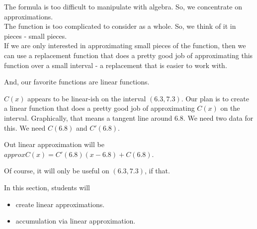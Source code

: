 \documentclass{ximera}
\begin{document}
The formula is too difficult to manipulate with algebra.  So, we concentrate on approximations. \\ 


The function is too complicated to consider as a whole. So, we think of it in pieces - small pieces. \\






If we are only interested in approximating small pieces of the function, then we can use a replacement function that does a pretty good job of approximating this function over a small interval - a replacement that is easier to work with.

And, our favorite functions are linear functions.


$C(x)$ appears to be linear-ish on the interval $(6.3, 7.3)$. Our plan is to create a linear function that does a pretty good job of approximating $C(x)$ on the interval. Graphically, that means a tangent line around $6.8$.  We need two data for this.  We need $C(6.8)$ and $C'(6.8)$.





Out linear approximation will be $approxC(x) = C'(6.8)(x-6.8) + C(6.8)$.

Of course, it will only be useful on $(6.3, 7.3)$, if that.









\begin{sectionOutcomes}
In this section, students will 

\begin{itemize}
\item create linear approximations.
\item accumulation via linear approximation.
\end{itemize}
\end{sectionOutcomes}
\end{document}
